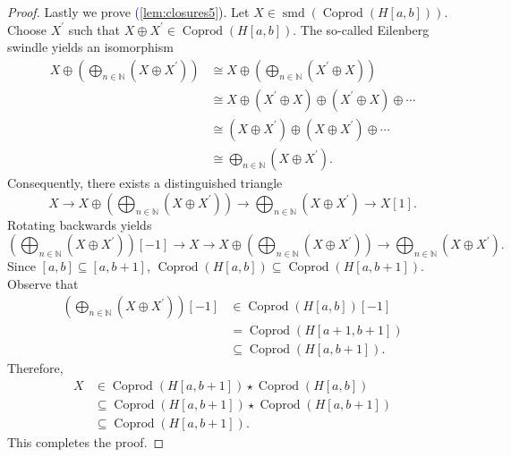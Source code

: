 \documentclass[11pt]{amsart}
\def\eqref#1{\textcolor{darkblue}{(\ref{#1})}}
\theoremstyle{plain}
\theoremstyle{definition}
\numberwithin{equation}{section}
\numberwithin{theorem}{section}
\begin{document}
\begin{proof}
    Lastly we prove \eqref{lem:closures5}. 
    Let $X\in \operatorname{smd}(\operatorname{Coprod}(H[a,b]))$.
    Choose $X^\prime$ such that $X\oplus X^\prime \in \operatorname{Coprod}(H[a,b])$.
    The so-called Eilenberg swindle yields an isomorphism
    \begin{displaymath}
        \begin{aligned}
            X \oplus (\bigoplus_{n\in \mathbb{N}} (X\oplus X^\prime)) 
            &\cong X \oplus (\bigoplus_{n\in \mathbb{N}} (X^\prime \oplus X)) 
            \\&\cong X \oplus (X^\prime \oplus X) \oplus (X^\prime \oplus X) \oplus \cdots
            \\&\cong (X \oplus X^\prime) \oplus (X \oplus X^\prime) \oplus \cdots
            \\&\cong \bigoplus_{n\in \mathbb{N}} (X \oplus X^\prime).
        \end{aligned}
    \end{displaymath}
    Consequently, there exists a distinguished triangle 
    \begin{displaymath}
        X \to X \oplus (\bigoplus_{n\in \mathbb{N}} (X\oplus X^\prime)) \to \bigoplus_{n\in \mathbb{N}}(X\oplus X^\prime) \to X[1].
    \end{displaymath}
    Rotating backwards yields 
    \begin{displaymath}
        (\bigoplus_{n\in \mathbb{N}}( X\oplus X^\prime))[-1] 
        \to X \to X \oplus (\bigoplus_{n\in \mathbb{N}} (X\oplus X^\prime)) \to \bigoplus_{n\in \mathbb{N}}( X\oplus X^\prime).
    \end{displaymath}
    Since $[a,b]\subseteq [a,b+1]$, $\operatorname{Coprod}(H[a,b]) \subseteq \operatorname{Coprod}(H[a,b+1])$.
    Observe that 
    \begin{displaymath}
        \begin{aligned}
            (\bigoplus_{n\in \mathbb{N}} (X\oplus X^\prime))[-1]
            &\in \operatorname{Coprod}(H[a,b])[-1] 
            \\&= \operatorname{Coprod}(H[a+1,b+ 1])
            \\&\subseteq \operatorname{Coprod}(H[a,b+1]).
        \end{aligned}
    \end{displaymath}
    Therefore, 
    \begin{displaymath}
        \begin{aligned}
            X 
            &\in \operatorname{Coprod}(H[a,b+1]) \star \operatorname{Coprod}(H[a,b])
            \\&\subseteq \operatorname{Coprod}(H[a,b+1]) \star \operatorname{Coprod}(H[a,b+1])
            \\&\subseteq \operatorname{Coprod}(H[a,b+1]).
        \end{aligned}
    \end{displaymath}
    This completes the proof.
\end{proof}
\end{document}
